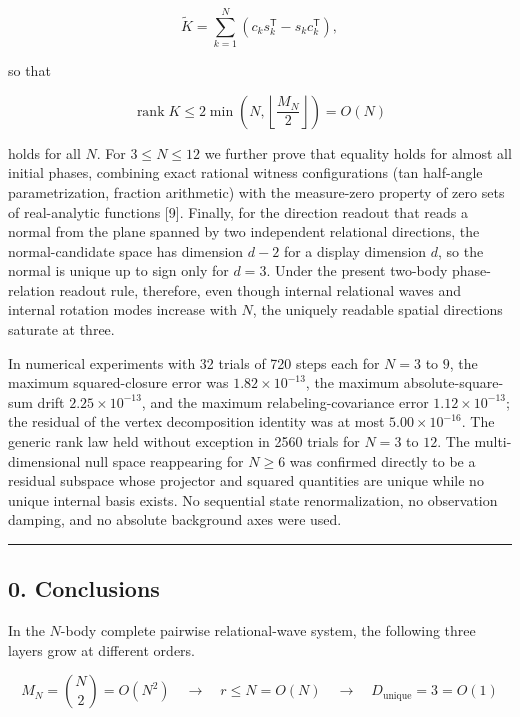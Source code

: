 \documentclass[
  a4paper,
]{article}
\begin{document}
\[
\widetilde K=\sum_{k=1}^{N}\left(c_k s_k^{\mathsf T}-s_k c_k^{\mathsf T}\right),
\]

so that

\[
\operatorname{rank}K\le 2\min\!\left(N,\left\lfloor\frac{M_N}{2}\right\rfloor\right)=O(N)
\]

holds for all \(N\). For \(3\le N\le12\) we further prove that equality
holds for almost all initial phases, combining exact rational witness
configurations (tan half-angle parametrization, fraction arithmetic)
with the measure-zero property of zero sets of real-analytic functions
{[}9{]}. Finally, for the direction readout that reads a normal from the
plane spanned by two independent relational directions, the
normal-candidate space has dimension \(d-2\) for a display dimension
\(d\), so the normal is unique up to sign only for \(d=3\). Under the
present two-body phase-relation readout rule, therefore, even though
internal relational waves and internal rotation modes increase with
\(N\), the uniquely readable spatial directions saturate at three.

In numerical experiments with 32 trials of 720 steps each for \(N=3\) to
\(9\), the maximum squared-closure error was \(1.82\times10^{-13}\), the
maximum absolute-square-sum drift \(2.25\times10^{-13}\), and the
maximum relabeling-covariance error \(1.12\times10^{-13}\); the residual
of the vertex decomposition identity was at most \(5.00\times10^{-16}\).
The generic rank law held without exception in 2560 trials for \(N=3\)
to \(12\). The multi-dimensional null space reappearing for \(N\ge6\)
was confirmed directly to be a residual subspace whose projector and
squared quantities are unique while no unique internal basis exists. No
sequential state renormalization, no observation damping, and no
absolute background axes were used.

\begin{center}\rule{0.5\linewidth}{0.5pt}\end{center}

\subsection{0. Conclusions}\label{conclusions}

In the \(N\)-body complete pairwise relational-wave system, the
following three layers grow at different orders.

\[
\boxed{
M_N=\binom{N}{2}=O(N^2)
\quad\longrightarrow\quad
r\le N=O(N)
\quad\longrightarrow\quad
D_{\mathrm{unique}}=3=O(1)
}
\]
\end{document}
